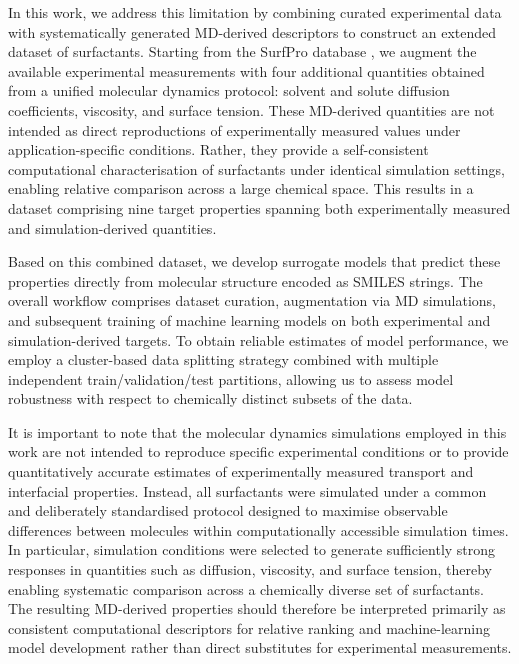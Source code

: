 \documentclass[letterpaper]{article}
\begin{document}
In this work, we address this limitation by combining curated experimental data with systematically generated MD-derived descriptors to construct an extended dataset of surfactants. Starting from the SurfPro database \cite{hodl_surfpro_2025}, we augment the available experimental measurements with four additional quantities obtained from a unified molecular dynamics protocol: solvent and solute diffusion coefficients, viscosity, and surface tension. These MD-derived quantities are not intended as direct reproductions of experimentally measured values under application-specific conditions. Rather, they provide a self-consistent computational characterisation of surfactants under identical simulation settings, enabling relative comparison across a large chemical space. This results in a dataset comprising nine target properties spanning both experimentally measured and simulation-derived quantities.

Based on this combined dataset, we develop surrogate models that predict these properties directly from molecular structure encoded as SMILES strings. The overall workflow comprises dataset curation, augmentation via MD simulations, and subsequent training of machine learning models on both experimental and simulation-derived targets. To obtain reliable estimates of model performance, we employ a cluster-based data splitting strategy combined with multiple independent train/validation/test partitions, allowing us to assess model robustness with respect to chemically distinct subsets of the data.

It is important to note that the molecular dynamics simulations employed in this work are not intended to reproduce specific experimental conditions or to provide quantitatively accurate estimates of experimentally measured transport and interfacial properties. Instead, all surfactants were simulated under a common and deliberately standardised protocol designed to maximise observable differences between molecules within computationally accessible simulation times. In particular, simulation conditions were selected to generate sufficiently strong responses in quantities such as diffusion, viscosity, and surface tension, thereby enabling systematic comparison across a chemically diverse set of surfactants. The resulting MD-derived properties should therefore be interpreted primarily as consistent computational descriptors for relative ranking and machine-learning model development rather than direct substitutes for experimental measurements.
\end{document}
